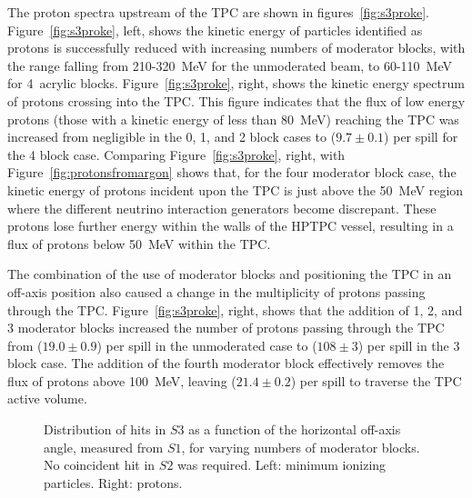 The proton spectra upstream of the TPC are shown in figures~\ref{fig:s3proke}.
Figure~\ref{fig:s3proke}, left, shows the kinetic energy of particles identified as protons is successfully reduced with increasing numbers of moderator blocks, with the range falling from 210-320~MeV for the unmoderated beam, to 60-110~MeV for 4~acrylic blocks.
Figure~\ref{fig:s3proke}, right, shows the kinetic energy spectrum of protons crossing into the TPC.
This figure indicates that the flux of low energy protons (those with a kinetic energy of less than 80~MeV) reaching the TPC was increased from negligible in the 0, 1, and 2 block cases to ($9.7 \pm 0.1$) per spill for the 4 block case.
Comparing Figure~\ref{fig:s3proke}, right, with Figure~\ref{fig:protonsfromargon} shows that, for the four moderator block case, the kinetic energy of protons incident upon the TPC is just above the 50~MeV region where the different neutrino interaction generators become discrepant.
These protons lose further energy within the walls of the HPTPC vessel, resulting in a flux of protons below 50~MeV within the TPC.

The combination of the use of moderator blocks and positioning the TPC in an off-axis position also caused a change in the multiplicity of protons passing through the TPC.
Figure~\ref{fig:s3proke}, right, shows that the addition of 1, 2, and 3 moderator blocks increased the number of protons passing through the TPC from ($19.0 \pm 0.9$) per spill in the unmoderated case to ($108 \pm 3$) per spill in the 3 block case.
The addition of the fourth moderator block effectively removes the flux of protons above 100~MeV, leaving ($21.4 \pm 0.2$) per spill to traverse the TPC active volume.
  
\begin{figure}[h]
  \begin{minipage}{0.48\textwidth}
    \begin{adjustbox}{max totalsize={\textwidth}{.35\textheight},center}
      
    \end{adjustbox}
  \end{minipage}
  \hspace{0.3cm}
  \begin{minipage}{0.48\textwidth}
    \begin{adjustbox}{max totalsize={\textwidth}{.35\textheight},center}
      
    \end{adjustbox}
  \end{minipage}
    \caption{\label{fig:s1s3mips}Distribution of hits in $\mathit{S3}$ as a function of the horizontal off-axis angle, measured from $\mathit{S1}$, for varying numbers of moderator blocks. No coincident hit in $\mathit{S2}$ was required. Left: minimum ionizing particles. Right: protons.}
\end{figure}

